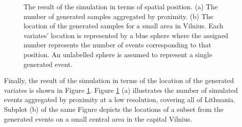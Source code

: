 \documentclass[12pt]{article}
\theoremstyle{definition}
\begin{document}
 \begin{figure}[!ht]
    \centering
    \qquad
    \caption{The result of the simulation in terms of spatial position. (a) The number of generated samples aggregated by proximity. (b) The location of the generated samples for a small area in Vilnius. Each variates' location is represented by a blue sphere where the assigned number represents the number of events corresponding to that position. An unlabelled sphere is assumed to represent a single generated event.}%
    \label{fig:result}
\end{figure}

Finally, the result of the simulation in terms of the location of the generated variates is shown in Figure \ref{fig:result}. Figure \ref{fig:result} (a) illustrates the number of simulated events aggregated by proximity at a low resolution, covering all of Lithuania. Subplot (b) of the same Figure depicts the locations of a subset from the generated events on a small central area in the capital Vilnius.  
\end{document}
